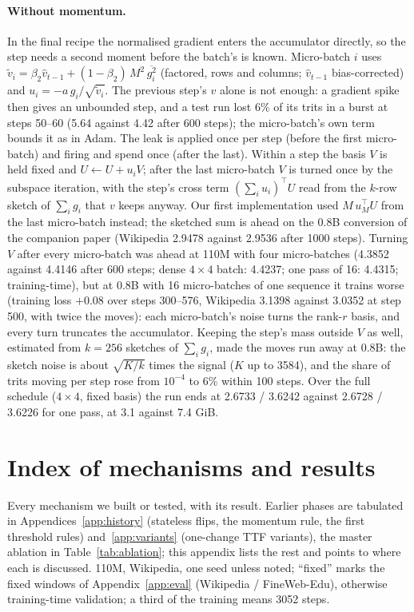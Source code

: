 \documentclass[10pt,twocolumn]{article}
\begin{document}
\paragraph{Without momentum.} In the final recipe the normalised gradient enters the accumulator directly, so the step
needs a second moment before the batch's is known. Micro-batch $i$ uses
$\tilde v_i=\beta_2\hat v_{t-1}+(1-\beta_2)\,M^2\,\overline{g_i^2}$ (factored, rows and columns; $\hat v_{t-1}$ bias-corrected) and
$u_i=-a\,g_i/\sqrt{\tilde v_i}$. The previous step's $v$ alone is not enough: a gradient spike then gives an unbounded
step, and a test run lost 6\% of its trits in a burst at steps 50--60 (5.64 against 4.42 after 600 steps); the
micro-batch's own term bounds it as in Adam. The leak is applied once per step (before the first micro-batch) and
firing and spend once (after the last). Within a step the basis $V$ is held fixed and $U\leftarrow U+u_iV$; after the
last micro-batch $V$ is turned once by the subspace iteration, with the step's cross term $(\sum_iu_i)^\top U$ read from
the $k$-row sketch of $\sum_ig_i$ that $v$ keeps anyway. Our first implementation used $M\,u_M^\top U$ from the last
micro-batch instead; the sketched sum is ahead on the 0.8B conversion of the companion paper (Wikipedia 2.9478 against
2.9536 after 1000 steps). Turning $V$ after every micro-batch was ahead at 110M with four micro-batches (4.3852 against
4.4146 after 600 steps; dense $4\times4$ batch: 4.4237; one pass of 16: 4.4315; training-time), but at 0.8B with 16
micro-batches of one sequence it trains worse (training loss $+0.08$ over steps 300--576, Wikipedia 3.1398 against
3.0352 at step 500, with twice the moves): each
micro-batch's noise turns the rank-$r$ basis, and every turn truncates the accumulator. Keeping the step's mass outside
$V$ as well, estimated from $k=256$ sketches of $\sum_ig_i$, made the moves run away at 0.8B: the sketch noise is about
$\sqrt{K/k}$ times the signal ($K$ up to 3584), and the share of trits moving per step rose from $10^{-4}$ to 6\% within
100 steps. Over the full schedule ($4\times4$, fixed basis) the run ends at 2.6733 / 3.6242 against 2.6728 / 3.6226 for
one pass, at 3.1 against 7.4 GiB.

\section{Index of mechanisms and results}\label{app:index}
Every mechanism we built or tested, with its result. Earlier phases are tabulated in Appendices~\ref{app:history}
(stateless flips, the momentum rule, the first threshold rules) and~\ref{app:variants} (one-change TTF variants), the
master ablation in Table~\ref{tab:ablation}; this appendix lists the rest and points to where each is discussed. 110M,
Wikipedia, one seed unless noted; ``fixed'' marks the fixed windows of Appendix~\ref{app:eval} (Wikipedia / FineWeb-Edu),
otherwise training-time validation; a third of the training means 3052 steps.
\end{document}
